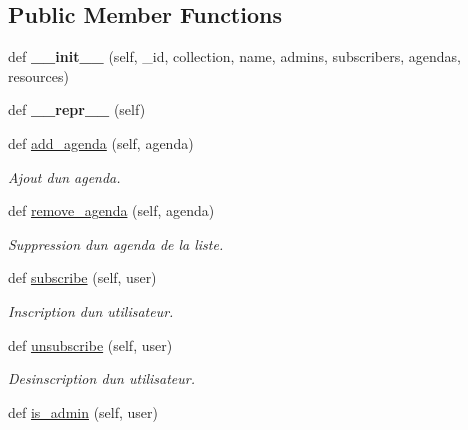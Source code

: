 \subsection*{Public Member Functions}
\begin{DoxyCompactItemize}
\item 
\mbox{\label{classSource_1_1core_1_1group_1_1Group_a9243664238a587738f4477dd43e1f688}} 
def {\bfseries \+\_\+\+\_\+init\+\_\+\+\_\+} (self, \+\_\+id, collection, name, admins, subscribers, agendas, resources)
\item 
\mbox{\label{classSource_1_1core_1_1group_1_1Group_a8993ec36f5da4b5ed248c193717eb5bd}} 
def {\bfseries \+\_\+\+\_\+repr\+\_\+\+\_\+} (self)
\item 
def \mbox{\hyperlink{classSource_1_1core_1_1group_1_1Group_ad778ec8b8e391fdada7ed5c1843ab1e1}{add\+\_\+agenda}} (self, agenda)
\begin{DoxyCompactList}\small\item\em Ajout d\textquotesingle{}un agenda. \end{DoxyCompactList}\item 
def \mbox{\hyperlink{classSource_1_1core_1_1group_1_1Group_ad9acb8c0acca1abf60bba16d21bb60a3}{remove\+\_\+agenda}} (self, agenda)
\begin{DoxyCompactList}\small\item\em Suppression d\textquotesingle{}un agenda de la liste. \end{DoxyCompactList}\item 
def \mbox{\hyperlink{classSource_1_1core_1_1group_1_1Group_a92e2cdd12d4220411d1e6990efe46ab4}{subscribe}} (self, user)
\begin{DoxyCompactList}\small\item\em Inscription d\textquotesingle{}un utilisateur. \end{DoxyCompactList}\item 
def \mbox{\hyperlink{classSource_1_1core_1_1group_1_1Group_a0ceabbe4c3cadd23a63628c8aa08023f}{unsubscribe}} (self, user)
\begin{DoxyCompactList}\small\item\em Desinscription d\textquotesingle{}un utilisateur. \end{DoxyCompactList}\item 
def \mbox{\hyperlink{classSource_1_1core_1_1group_1_1Group_aef733eb961bc40234c9c1612844f3708}{is\+\_\+admin}} (self, user)

\end{DoxyCompactItemize}
